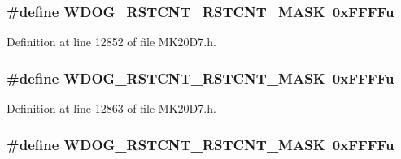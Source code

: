 \subsubsection[{\texorpdfstring{W\+D\+O\+G\+\_\+\+R\+S\+T\+C\+N\+T\+\_\+\+R\+S\+T\+C\+N\+T\+\_\+\+M\+A\+SK}{WDOG_RSTCNT_RSTCNT_MASK}}]{\setlength{\rightskip}{0pt plus 5cm}\#define W\+D\+O\+G\+\_\+\+R\+S\+T\+C\+N\+T\+\_\+\+R\+S\+T\+C\+N\+T\+\_\+\+M\+A\+SK~0x\+F\+F\+F\+Fu}\hypertarget{group___w_d_o_g___register___masks_ga1cb55a509947b315d216ed9d822a4967}{}\label{group___w_d_o_g___register___masks_ga1cb55a509947b315d216ed9d822a4967}


Definition at line 12852 of file M\+K20\+D7.\+h.

\subsubsection[{\texorpdfstring{W\+D\+O\+G\+\_\+\+R\+S\+T\+C\+N\+T\+\_\+\+R\+S\+T\+C\+N\+T\+\_\+\+M\+A\+SK}{WDOG_RSTCNT_RSTCNT_MASK}}]{\setlength{\rightskip}{0pt plus 5cm}\#define W\+D\+O\+G\+\_\+\+R\+S\+T\+C\+N\+T\+\_\+\+R\+S\+T\+C\+N\+T\+\_\+\+M\+A\+SK~0x\+F\+F\+F\+Fu}\hypertarget{group___w_d_o_g___register___masks_ga1cb55a509947b315d216ed9d822a4967}{}\label{group___w_d_o_g___register___masks_ga1cb55a509947b315d216ed9d822a4967}


Definition at line 12863 of file M\+K20\+D7.\+h.

\subsubsection[{\texorpdfstring{W\+D\+O\+G\+\_\+\+R\+S\+T\+C\+N\+T\+\_\+\+R\+S\+T\+C\+N\+T\+\_\+\+M\+A\+SK}{WDOG_RSTCNT_RSTCNT_MASK}}]{\setlength{\rightskip}{0pt plus 5cm}\#define W\+D\+O\+G\+\_\+\+R\+S\+T\+C\+N\+T\+\_\+\+R\+S\+T\+C\+N\+T\+\_\+\+M\+A\+SK~0x\+F\+F\+F\+Fu}\hypertarget{group___w_d_o_g___register___masks_ga1cb55a509947b315d216ed9d822a4967}{}\label{group___w_d_o_g___register___masks_ga1cb55a509947b315d216ed9d822a4967}


